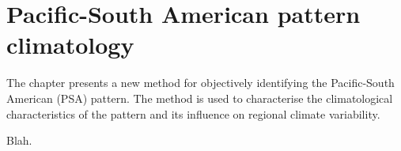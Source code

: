 
\chapter{Pacific-South American pattern climatology}


\begin{synopsis}

The chapter presents a new method for objectively identifying the Pacific-South American (PSA) pattern. The method is used to characterise the climatological characteristics of the pattern and its influence on regional climate variability.

\end{synopsis}



Blah.